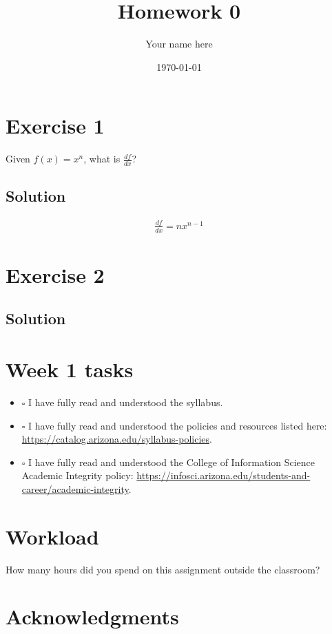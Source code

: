 \documentclass[11pt]{article}
\title{Homework 0}
\author{Your name here}
\date{\today{}}
\begin{document}
\maketitle

\section{Exercise 1}

Given $f(x) = x^n$, what is $\frac{df}{dx}$?

\subsection*{Solution}

\begin{align}
    \frac{df}{dx} = nx^{n-1}
\end{align}

\section{Exercise 2}


\subsection*{Solution}


\section{Week 1 tasks}

\begin{itemize}
    \item $\square$ I have fully read and understood the syllabus.
    \item $\square$ I have fully read and understood the policies and resources listed here:
        \url{https://catalog.arizona.edu/syllabus-policies}.
    \item $\square$ I have fully read and understood the College of Information
        Science Academic Integrity policy:
        \url{https://infosci.arizona.edu/students-and-career/academic-integrity}.
\end{itemize}


\section{Workload}

How many hours did you spend on this assignment outside the classroom?

\section{Acknowledgments}

\end{document}
